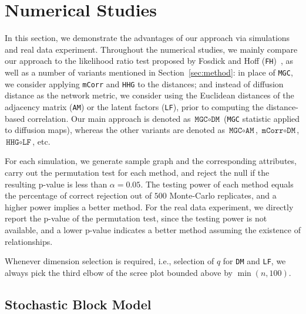 \documentclass[11pt]{article}
\theoremstyle{definition}
\begin{document}
\section{Numerical Studies}
\label{sec:simulation}

In this section, we demonstrate the advantages of our approach via simulations and real data experiment. Throughout the numerical studies, we mainly compare our approach to the likelihood ratio test proposed by Fosdick and Hoff (\texttt{FH})~\cite{fosdick2015testing}, as well as a number of variants mentioned in Section~\ref{sec:method}: in place of \texttt{MGC}, we consider applying \texttt{mCorr} and \texttt{HHG} to the distances; and instead of diffusion distance as the network metric, we consider using the Euclidean distances of the adjacency matrix (\texttt{AM}) or the latent factors (\texttt{LF}), prior to computing the distance-based correlation. Our main approach is denoted as $\texttt{MGC} \circ \texttt{DM}$ (\texttt{MGC} statistic applied to diffusion maps), whereas the other variants are denoted as $\texttt{MGC} \circ \texttt{AM}$, $\texttt{mCorr} \circ \texttt{DM}$, $\texttt{HHG} \circ \texttt{LF}$, etc. 

For each simulation, we generate sample graph and the corresponding attributes, carry out the permutation test for each method, and reject the null if the resulting p-value is less than $\alpha = 0.05$. The testing power of each method equals the percentage of correct rejection out of $500$ Monte-Carlo replicates, and a higher power implies a better method. For the real data experiment, we directly report the p-value of the permutation test, since the testing power is not available, and a lower p-value indicates a better method assuming the existence of relationships. 

Whenever dimension selection is required, i.e., selection of $q$ for \texttt{DM} and \texttt{LF}, we always pick the third elbow of the scree plot bounded above by $\min(n, 100)$. 

\subsection{Stochastic Block Model}
\end{document}
